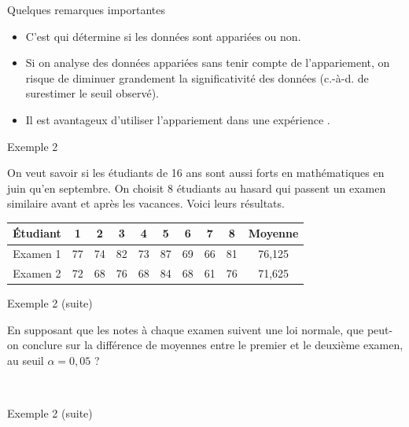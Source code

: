 \documentclass{BeamerTemplate}
\begin{document}
\begin{frame}[t]{Quelques remarques importantes}
\begin{itemize}
\item<1-> C'est  qui détermine si les données sont appariées ou non.
\item<2-> Si on analyse des données appariées sans tenir compte de l'appariement, on risque de diminuer grandement la significativité des données (c.-à-d. de surestimer le seuil observé).
\item<3-> Il est avantageux d'utiliser l'appariement dans une expérience .
\end{itemize}
\end{frame}


\begin{frame}[t]{Exemple 2}

On veut savoir si les étudiants de 16 ans sont aussi forts en mathématiques en juin qu'en septembre. On choisit 8 étudiants au hasard qui passent un examen similaire avant et après les vacances. Voici leurs résultats.
\vspace{2mm}


\begin{center}
\begin{tabular}{|c|cccccccc|c|}\hline
\'Etudiant & 1 & 2 & 3 & 4 & 5 & 6 & 7 & 8 & Moyenne\\ \hline
Examen 1 & 77 & 74 & 82 & 73 & 87 & 69 & 66 & 81& 76,125\\
Examen 2 & 72 & 68 & 76 & 68 & 84 & 68 & 61 & 76 &71,625\\ \hline
\end{tabular}
\end{center}

\bigskip
\end{frame}

\begin{frame}[t]{Exemple 2 (suite)}

En supposant que les notes à chaque examen suivent une loi normale, que peut-on conclure sur la différence de moyennes entre le premier et le deuxième examen, au seuil $\alpha=0,05$ ?

{\ }
\end{frame}


\begin{frame}[t]{Exemple 2 (suite)}

{\ }
\end{frame}
\end{document}
